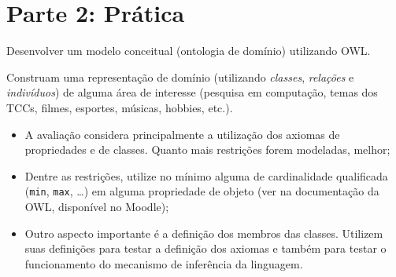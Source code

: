 \documentclass[answers]{exam}
\begin{document}
    \section{Parte 2: Prática}
    \begin{questions}
        \question{}
        Desenvolver um modelo conceitual (ontologia de domínio) utilizando
        OWL\@.

        Construam uma representação de domínio (utilizando \emph{classes},
        \emph{relações} e \emph{indivíduos}) de alguma área de interesse
        (pesquisa em computação, temas dos TCCs, filmes, esportes, músicas,
        hobbies, etc.).

        \begin{superframe}
            \begin{itemize}
                \item A avaliação considera principalmente a utilização dos
                    axiomas de propriedades e de classes. Quanto mais
                    restrições forem modeladas, melhor;

                \item Dentre as restrições, utilize no mínimo alguma de
                    cardinalidade qualificada (\texttt{min}, \texttt{max},
                    \ldots) em alguma propriedade de objeto (ver na
                    documentação da OWL, disponível no Moodle);

                \item Outro aspecto importante é a definição dos membros das
                    classes. Utilizem suas definições para testar a definição
                    dos axiomas e também para testar o funcionamento do
                    mecanismo de inferência da linguagem.
            \end{itemize}
        \end{superframe}
    \end{questions}

    
    
    \nocite{*}
\end{document}
